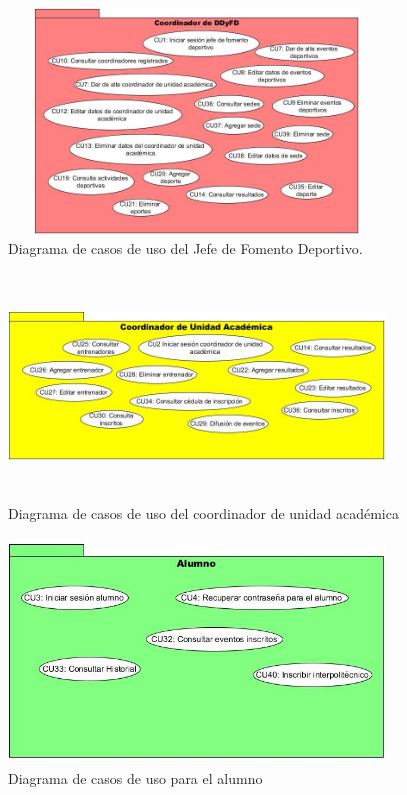 	\begin{figure} [hbt!]
		\centering
		\includegraphics[width=10cm, height=6cm]{Imagenes/diagramaCUJFD}
		\caption{Diagrama de casos de uso del Jefe de Fomento Deportivo.}
		\label{diagramacujfd}
	\end{figure}
\pagebreak
	
	\begin{figure}[hbt!]
		\centering
		\includegraphics[width=10cm, height=6cm]{Imagenes/diagramaCUCoord}
		\caption{Diagrama de casos de uso del coordinador de unidad académica}
		\label{diagramacucoord}
	\end{figure}

	\begin{figure} [hbt!]
		\centering
		\includegraphics[width=10cm, height=6cm]{Imagenes/diagramaCUAlumno}
		\caption{Diagrama de casos de uso para el alumno}
		\label{diagramacualumno}
	\end{figure}
	
